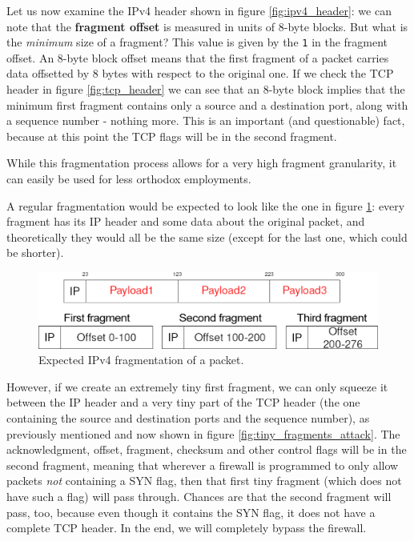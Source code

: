 Let us now examine the IPv4 header shown in figure \ref{fig:ipv4_header}: we can note that the \textbf{fragment offset} is measured in units of 8-byte blocks. But what is the \textit{minimum} size of a fragment? This value is given by the \texttt{1} in the fragment offset. An 8-byte block offset means that the first fragment of a packet carries data offsetted by 8 bytes with respect to the original one. If we check the TCP header in figure \ref{fig:tcp_header} we can see that an 8-byte block implies that the minimum first fragment contains only a source and a destination port, along with a sequence number - nothing more. This is an important (and questionable) fact, because at this point the TCP flags will be in the second fragment.

While this fragmentation process allows for a very high fragment granularity, it can easily be used for less orthodox employments.

A regular fragmentation would be expected to look like the one in figure \ref{fig:ipv4_fragments_expected}: every fragment has its IP header and some data about the original packet, and theoretically they would all be the same size (except for the last one, which could be shorter).

\begin{figure}[h]
    \centering
    \includegraphics[scale=0.4]{img/ipv4_fragments_expected.png}
    \decoRule
    \caption{Expected IPv4 fragmentation of a packet.}
    \label{fig:ipv4_fragments_expected}
\end{figure}

However, if we create an extremely tiny first fragment, we can only squeeze it between the IP header and a very tiny part of the TCP header (the one containing the source and destination ports and the sequence number), as previously mentioned and now shown in figure \ref{fig:tiny_fragments_attack}. The acknowledgment, offset, fragment, checksum and other control flags will be in the second fragment, meaning that wherever a firewall is programmed to only allow packets \textit{not} containing a SYN flag, then that first tiny fragment (which does not have such a flag) will pass through. Chances are that the second fragment will pass, too, because even though it contains the SYN flag, it does not have a complete TCP header. In the end, we will completely bypass the firewall.

